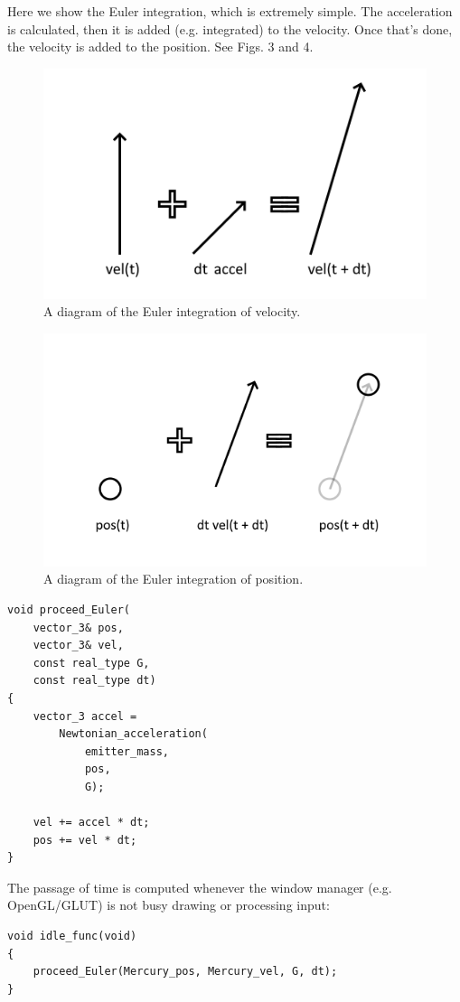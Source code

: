 \documentclass[12pt]{article}
\begin{document}
Here we show the Euler integration, which is extremely simple.
The acceleration is calculated, then it is added (e.g. integrated) to the velocity.
Once that's done, the velocity is added to the position.
See Figs. 3 and 4.
\begin{figure} 
\centering
\label{fig3}
  \includegraphics[width = 4 in]{velocity.png}
  \caption{
A diagram of the Euler integration of velocity.
}
\end{figure}
\begin{figure} 
\centering
\label{fig4}
  \includegraphics[width = 4 in]{position.png}
  \caption{
A diagram of the Euler integration of position.
}
\end{figure}

\begin{lstlisting}
void proceed_Euler(
	vector_3& pos, 
	vector_3& vel, 
	const real_type G, 
	const real_type dt)
{
	vector_3 accel = 
		Newtonian_acceleration(
			emitter_mass, 
			pos, 
			G);

	vel += accel * dt;
	pos += vel * dt;
}

\end{lstlisting}

The passage of time is computed whenever the window manager (e.g. OpenGL/GLUT) is not busy drawing or processing input:
\begin{lstlisting}
void idle_func(void)
{
	proceed_Euler(Mercury_pos, Mercury_vel, G, dt);
}
\end{lstlisting}
\end{document}

